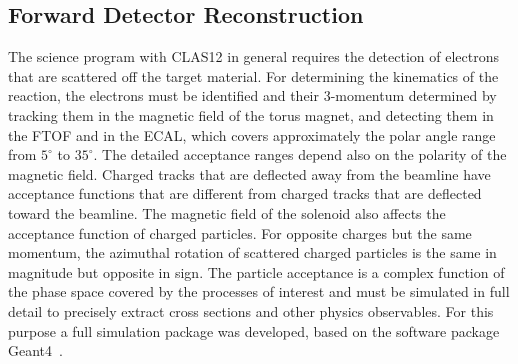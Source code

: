 \documentclass[final,3p,twocolumn]{elsarticle}
\begin{document}
\subsection{Forward Detector Reconstruction} 

The science program with CLAS12 in general requires the detection of electrons that are scattered off the target
material. For determining the kinematics of the reaction, the electrons must be identified and their 3-momentum
determined by tracking them in the magnetic field of the torus magnet, and detecting them in the FTOF and in the
ECAL, which covers approximately the polar angle range from $5^\circ$ to $35^\circ$. The detailed acceptance
ranges depend also on the polarity of the magnetic field. Charged tracks that are deflected away from the beamline
have acceptance functions that are different from charged tracks that are deflected toward the beamline. The
magnetic field of the solenoid also affects the acceptance function of charged particles. For opposite charges but
the same momentum, the azimuthal rotation of scattered charged particles is the same in magnitude but opposite in
sign. The particle acceptance is a complex function of the phase space covered by the processes of interest and 
must be simulated in full detail to precisely extract cross sections and other physics observables.  For this purpose 
a full simulation package was developed, based on the software package Geant4~\cite{GEMC}. 
\end{document}
